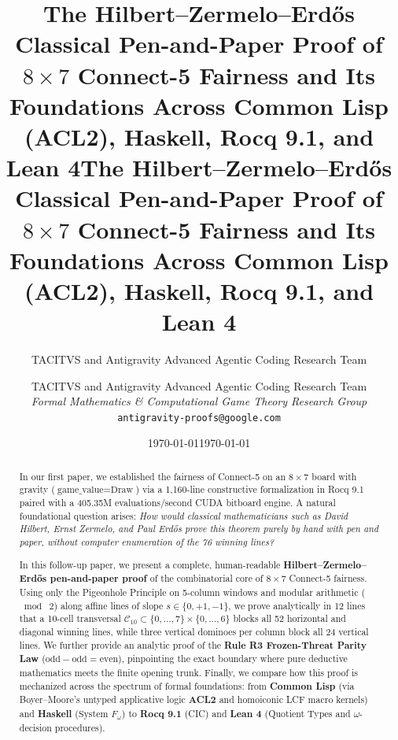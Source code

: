 \documentclass[11pt,reqno]{amsart}
\title[The Hilbert--Erd\H{o}s Pen-and-Paper Proof of $8 \times 7$ Connect-5]{The Hilbert--Zermelo--Erd\H{o}s Classical Pen-and-Paper Proof of $8 \times 7$ Connect-5 Fairness and Its Foundations Across Common Lisp (ACL2), Haskell, Rocq 9.1, and Lean 4}
\title{The Hilbert--Zermelo--Erd\H{o}s Classical Pen-and-Paper Proof of $8 \times 7$ Connect-5 Fairness and Its Foundations Across Common Lisp (ACL2), Haskell, Rocq 9.1, and Lean 4}
\author{TACITVS and Antigravity Advanced Agentic Coding Research Team}
\date{\today}
\author{
    TACITVS and Antigravity Advanced Agentic Coding Research Team\\
    \textit{Formal Mathematics \& Computational Game Theory Research Group}\\
    \texttt{antigravity-proofs@google.com}
  }
\date{\today}
\theoremstyle{plain}
\theoremstyle{definition}
\theoremstyle{remark}
\begin{document}
\ifx\StyleMode\AMS
  \begin{abstract}
  In our first paper, we established the fairness of Connect-5 on an $8 \times 7$ board with gravity ($\text{game\_value} = \text{Draw}$) via a 1,160-line constructive formalization in Rocq 9.1 paired with a 405.35M evaluations/second CUDA bitboard engine. A natural foundational question arises: \emph{How would classical mathematicians such as David Hilbert, Ernst Zermelo, and Paul Erd\H{o}s prove this theorem purely by hand with pen and paper, without computer enumeration of the 76 winning lines?}
  
  In this follow-up paper, we present a complete, human-readable \textbf{Hilbert--Zermelo--Erd\H{o}s pen-and-paper proof} of the combinatorial core of $8 \times 7$ Connect-5 fairness. Using only the Pigeonhole Principle on 5-column windows and modular arithmetic ($\bmod\; 2$) along affine lines of slope $s \in \{0, +1, -1\}$, we prove analytically in 12 lines that a 10-cell transversal $\mathcal{C}_{10} \subset \{0,\dots,7\} \times \{0,\dots,6\}$ blocks all 52 horizontal and diagonal winning lines, while three vertical dominoes per column block all 24 vertical lines. We further provide an analytic proof of the \textbf{Rule R3 Frozen-Threat Parity Law} ($\text{odd} - \text{odd} = \text{even}$), pinpointing the exact boundary where pure deductive mathematics meets the finite opening trunk. Finally, we compare how this proof is mechanized across the spectrum of formal foundations: from \textbf{Common Lisp} (via Boyer--Moore's untyped applicative logic \textbf{ACL2} and homoiconic LCF macro kernels) and \textbf{Haskell} ($\text{System } F_\omega$) to \textbf{Rocq 9.1} (CIC) and \textbf{Lean 4} (Quotient Types and $\omega$-decision procedures).
  \end{abstract}
  \maketitle
\else
  \maketitle
\end{document}
